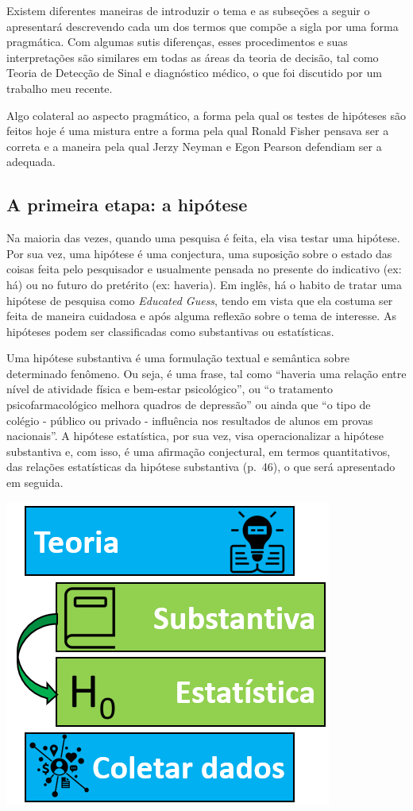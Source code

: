 \documentclass[
]{book}
\begin{document}
Existem diferentes maneiras de introduzir o tema e as subseções a seguir o apresentará descrevendo cada um dos termos que compõe a sigla por uma forma pragmática. Com algumas sutis diferenças, esses procedimentos e suas interpretações são similares em todas as áreas da teoria de decisão, tal como Teoria de Detecção de Sinal e diagnóstico médico, o que foi discutido por um trabalho meu recente.

Algo colateral ao aspecto pragmático, a forma pela qual os testes de hipóteses são feitos hoje é uma mistura entre a forma pela qual Ronald Fisher pensava ser a correta e a maneira pela qual Jerzy Neyman e Egon Pearson defendiam ser a adequada.

\hypertarget{a-primeira-etapa-a-hipuxf3tese}{%
\subsection{A primeira etapa: a hipótese}\label{a-primeira-etapa-a-hipuxf3tese}}

Na maioria das vezes, quando uma pesquisa é feita, ela visa testar uma hipótese. Por sua vez, uma hipótese é uma conjectura, uma suposição sobre o estado das coisas feita pelo pesquisador e usualmente pensada no presente do indicativo (ex: há) ou no futuro do pretérito (ex: haveria). Em inglês, há o habito de tratar uma hipótese de pesquisa como \emph{Educated Guess}, tendo em vista que ela costuma ser feita de maneira cuidadosa e após alguma reflexão sobre o tema de interesse. As hipóteses podem ser classificadas como substantivas ou estatísticas.

Uma hipótese substantiva é uma formulação textual e semântica sobre determinado fenômeno. Ou seja, é uma frase, tal como ``haveria uma relação entre nível de atividade física e bem-estar psicológico'', ou ``o tratamento psicofarmacológico melhora quadros de depressão'' ou ainda que ``o tipo de colégio - público ou privado - influência nos resultados de alunos em provas nacionais''. A hipótese estatística, por sua vez, visa operacionalizar a hipótese substantiva e, com isso, é uma afirmação conjectural, em termos quantitativos, das relações estatísticas da hipótese substantiva (p.~46), o que será apresentado em seguida.

\includegraphics{./img/cap_inferencia_tipos_hipoteses.png}
\end{document}
